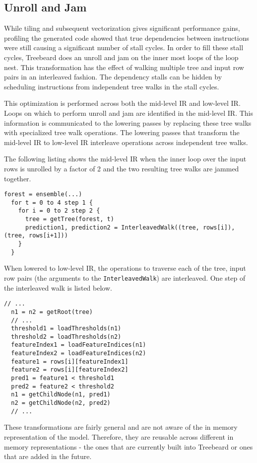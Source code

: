 \subsection{Unroll and Jam}
While tiling and subsequent vectorization gives significant performance gains, profiling 
the generated code showed that true dependencies between instructions were still causing
a significant number of stall cycles. In order to fill these stall cycles, Treebeard does 
an unroll and jam on the inner most loops of the loop nest. This transformation has 
the effect of walking multiple tree and input row pairs in an interleaved fashion. 
The dependency stalls can be hidden by scheduling instructions from independent tree walks 
in the stall cycles. 

This optimization is performed across both the mid-level IR and low-level IR. Loops on which 
to perform unroll and jam are identified in the mid-level IR. This information is communicated to the 
lowering passes by replacing these tree walks with specialized tree walk operations. The lowering 
passes that transform the mid-level IR to low-level IR interleave operations across independent
tree walks.

The following listing shows the mid-level IR when the inner loop over the input rows is unrolled 
by a factor of 2 and the two resulting tree walks are jammed together.

\begin{lstlisting}[style=c++]
  forest = ensemble(...)
  for t = 0 to 4 step 1 {
    for i = 0 to 2 step 2 {
      tree = getTree(forest, t)
      prediction1, prediction2 = InterleavedWalk((tree, rows[i]), (tree, rows[i+1]))
    }
  }
\end{lstlisting}

When lowered to low-level IR, the operations to traverse each of the tree, input row pairs 
(the arguments to the \texttt{InterleavedWalk}) are interleaved. One step of the interleaved 
walk is listed below. 
\begin{lstlisting}[style=c++]
  // ... 
  n1 = n2 = getRoot(tree)
  // ...
  threshold1 = loadThresholds(n1)
  threshold2 = loadThresholds(n2)
  featureIndex1 = loadFeatureIndices(n1)
  featureIndex2 = loadFeatureIndices(n2)
  feature1 = rows[i][featureIndex1]
  feature2 = rows[i][featureIndex2]
  pred1 = feature1 < threshold1
  pred2 = feature2 < threshold2
  n1 = getChildNode(n1, pred1)
  n2 = getChildNode(n2, pred2)
  // ...
\end{lstlisting}
These transformations are fairly general and are not aware of the in memory representation of the model. Therefore, they 
are reusable across different in memory representations - the ones that are currently built into Treebeard or ones that 
are added in the future.
